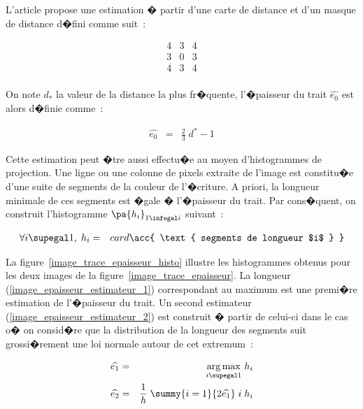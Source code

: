 L'article  propose une estimation � partir d'une carte de distance et d'un masque de distance d�fini comme suit~:

            $$
            \begin{array}{c|c|c}
            4 & 3 & 4 \\ \hline
            3 & 0 & 3 \\ \hline
            4 & 3 & 4 \\
            \end{array}
            $$

On note $d_*$ la valeur de la distance la plus fr�quente, l'�paisseur du trait $\widehat{e_0}$ est alors d�finie comme~:

            \begin{eqnarray}
            \widehat{e_0} &=& \frac{2}{3} \; d^* - 1
            \end{eqnarray}



Cette estimation peut �tre aussi effectu�e au moyen d'histogrammes de projection. Une ligne ou une colonne de pixels extraite de l'image est constitu�e d'une suite de segments de la couleur de l'�criture. A priori, la longueur minimale de ces segments est �gale � l'�paisseur du trait. Par cons�quent, on construit l'histogramme $\pa{h_i}_{1 \infegal i }$ suivant~:

            \begin{eqnarray}
            \forall i \supegal 1, \; h_i &=& card  \acc{ \text{ segments de longueur $i$ } }
            \end{eqnarray}


La figure~\ref{image_trace_epaisseur_histo} illustre les histogrammes obtenus pour les deux images de la figure~\ref{image_trace_epaisseur}. La longueur (\ref{image_epaisseur_estimateur_1}) correspondant au maximum est une premi�re estimation de l'�paisseur du trait. Un second estimateur (\ref{image_epaisseur_estimateur_2}) est construit � partir de celui-ci dans le cas o� on consid�re que la distribution de la longueur des segments suit grossi�rement une loi normale autour de cet extremum~: 

        \begin{eqnarray}
        \widehat{e_1} &=&    \underset{i \supegal 1}{\arg \max} \; h_i \label{image_epaisseur_estimateur_1} \\
        \widehat{e_2}    &=&    \frac{1}{h} \; \summy{i = 1}{2\widehat{e_1}} \; i \; h_i  
                                                                                            \label{image_epaisseur_estimateur_2} 
        \end{eqnarray}




